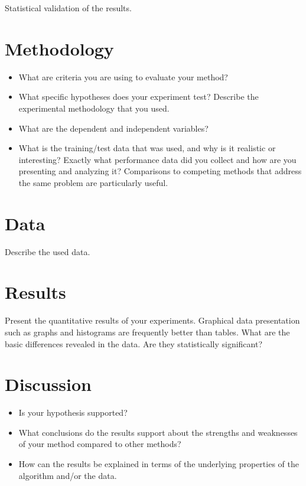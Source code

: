 \documentclass[runningheads,a4paper,11pt]{report}
\begin{document}
Statistical validation of the results.


\section{Methodology}
\label{section:methodology}

\begin{itemize}
	\item What are criteria you are using to evaluate your method? 
	\item What specific hypotheses does your experiment test? Describe the experimental methodology that you used. 
	\item What are the dependent and independent variables? 
	\item What is the training/test data that was used, and why is it realistic or interesting? Exactly what performance data did you collect and how are you presenting and analyzing it? Comparisons to competing methods that address the same problem are particularly useful.
\end{itemize}

\section{Data}
\label{section:data}

Describe the used data.

\section{Results}
\label{section:results}

Present the quantitative results of your experiments. Graphical data presentation such as graphs and histograms are frequently better than tables. What are the basic differences revealed in the data. Are they statistically significant?

\section{Discussion}
\label{section:discussion}

\begin{itemize}
	\item Is your hypothesis supported? 
	\item What conclusions do the results support about the strengths and weaknesses of your method compared to other methods? 
	\item How can the results be explained in terms of the underlying properties of the algorithm and/or the data. 
\end{itemize}
\end{document}
